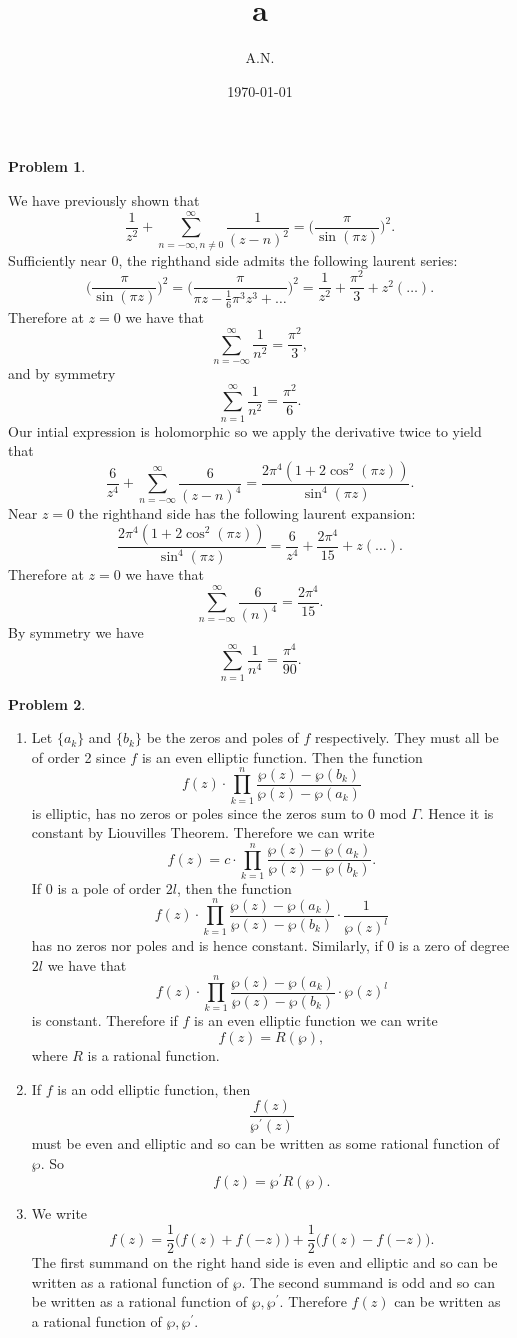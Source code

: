 \documentclass[12pt, a4paper]{article}
\title{a}
\author{A.N.}
\date{\today}
\newtheorem{problem}{Problem}
\theoremstyle{definition}
\begin{document}
	\begin{problem}
	\end{problem}
We have previously shown that $$\frac{1}{z^2} + \sum_{n= -\infty, n\neq 0 }^\infty \frac{1}{(z-n)^2} = \Big(\frac{\pi}{\sin(\pi z)} \Big)^2.$$ Sufficiently near $0$, the righthand side admits the following laurent series: 
$$\Big(\frac{\pi}{\sin(\pi z)} \Big)^2 = \Big( \frac{\pi}{\pi z - \frac{1}{6}\pi^3 z^3 + \dots  } \Big)^2 = \frac{1}{z^2} + \frac{\pi^2}{3} + z^2(\dots).$$ Therefore at $z=0$
we have that $$\sum_{n= -\infty}^\infty \frac{1}{n^2} =\frac{\pi^2}{3},$$ and by symmetry 
$$\sum_{n= 1}^\infty \frac{1}{n^2} = \frac{\pi^2}{6}. $$
Our intial expression is holomorphic so we apply the derivative twice to yield that 
$$\frac{6}{z^4} + \sum_{n = -\infty}^{\infty} \frac{6}{(z-n)^4} = \frac{2\pi^4 (1+ 2\cos^2(\pi z))}{\sin^4(\pi z)}.$$ Near $z=0$ the righthand side has the following laurent expansion: 
$$\frac{2\pi^4 (1+ 2\cos^2(\pi z))}{\sin^4(\pi z)} = \frac{6}{z^4} + \frac{2\pi^4}{15} + z( \dots). $$
Therefore at $z=0$ we have that $$\sum_{n = -\infty }^\infty \frac{6}{(n)^4} = \frac{2\pi^4}{15}.$$ By symmetry we have $$\sum_{n = 1}^\infty \frac{1}{n^4} = \frac{\pi^4}{90}. $$
\newpage
\begin{problem}
\end{problem}
\begin{enumerate}[label=\alph*)]
	\item Let $\{a_k\}$ and $\{b_k\}$ be the zeros and poles of $f$ respectively. They must all be of order 2 since $f$ is an even elliptic function. Then the function $$ f(z) \cdot \prod_{k=1}^n \frac{\wp(z) - \wp(b_k)}{\wp(z) - \wp(a_k)}$$ is elliptic, has no zeros or poles since the zeros sum to $0$ mod $\Gamma$. Hence it is constant by Liouvilles Theorem. Therefore we can write $$f(z) = c\cdot \prod_{k=1}^n \frac{\wp(z) - \wp(a_k)}{\wp(z) - \wp(b_k)}. $$
	If $0 $ is a pole of order $2l$, then the function $$f(z) \cdot \prod_{k=1}^n \frac{\wp(z) - \wp(a_k)}{\wp(z) - \wp(b_k)} \cdot \frac{1}{\wp(z)^l}$$ has no zeros nor poles and is hence constant. Similarly, if $0$ is a zero of degree $2l$ we have that $$f(z) \cdot \prod_{k=1}^n \frac{\wp(z) - \wp(a_k)}{\wp(z) - \wp(b_k)} \cdot \wp(z)^l $$ is constant. Therefore if $f$ is an even elliptic function we can write $$f(z) = R(\wp),$$ where $R$ is a rational function. 
	\item If $f$ is an odd elliptic function, then $$\frac{f(z)}{\wp^\prime(z)}$$ must be even and elliptic and so can be written as some rational function of $\wp$. So $$f(z) = \wp^\prime R(\wp). $$
	\item We write $$f(z) = \frac{1}{2} \Big(f(z) + f(-z) \Big)  + \frac{1}{2} \Big(f(z) - f(-z) \Big). $$
	The first summand on the right hand side is even and elliptic and so can be written as a rational function of $\wp$. The second summand is odd and so can be written as a rational function of $\wp, \wp^\prime$. Therefore $f(z)$ can be written as a rational function of $\wp, \wp^\prime$.
\end{enumerate} 
\end{document}
